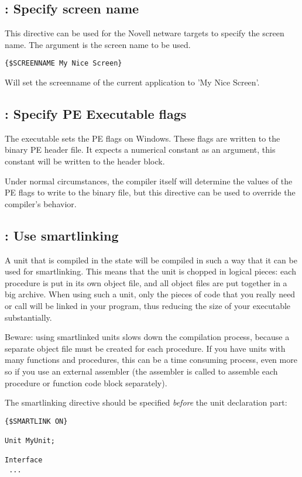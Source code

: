 \subsection{ : Specify screen name}
This directive can be used for the Novell netware targets to specify the screen name. 
The argument is the screen name to be used.
\begin{verbatim}
{$SCREENNAME My Nice Screen}
\end{verbatim}
Will set the screenname of the current application to 'My Nice Screen'.

\subsection{ : Specify PE Executable flags}
The  executable sets the PE flags on Windows. These 
flags are written to the binary PE header file. It expects a numerical
constant as an argument, this constant will be written to the header block.

Under normal circumstances, the compiler itself will determine the values of
the PE flags to write to the binary file, but this directive can be used to
override the compiler's behavior.
 
\subsection{ : Use smartlinking}

A unit that is compiled in the  state will be
compiled in such a way that it can be used for smartlinking. This means that
the unit is chopped in logical pieces: each procedure is put in its own
object file, and all object files are put together in a big archive. When
using such a unit, only the pieces of code that you really need or call
will be linked in your program, thus reducing the size of your executable
substantially.

Beware: using smartlinked units slows down the compilation process, because
a separate object file must be created for each procedure. If you have units
with many functions and procedures, this can be a time consuming process,
even more so if you use an external assembler (the assembler is called to
assemble each procedure or function code block separately).

The smartlinking directive should be specified {\em before} the unit
declaration part:
\begin{verbatim}
{$SMARTLINK ON}

Unit MyUnit;

Interface
 ...
\end{verbatim}

